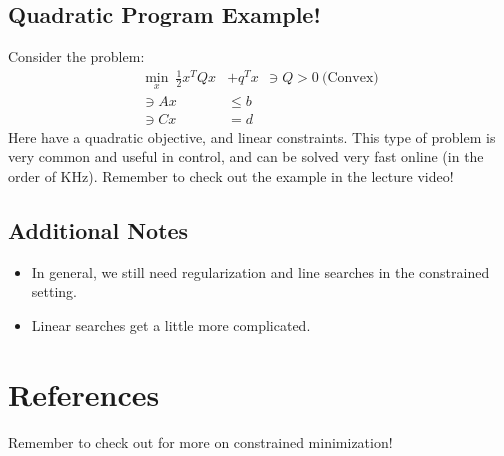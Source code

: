 \subsection{Quadratic Program Example!}
Consider the problem: 
\begin{align}
    \min_x \ \frac{1}{2} x^T Q x &+ q^T x \ \ \ni Q >0  \ \textrm{(Convex)} \\
    \ni Ax &\leq b \\
    \ni Cx &= d
\end{align}
Here have a quadratic objective, and linear constraints. This type of problem is very common and useful in control, and can be solved very fast online (in the order of KHz).
Remember to check out the example in the lecture video! 

\subsection{Additional Notes}
\begin{itemize}
    \item In general, we still need regularization and line searches in the constrained setting. 
    \item Linear searches get a little more complicated. 
\end{itemize}

\section{References}
Remember to check out \cite{nocedal2006numerical} for more on constrained minimization! 

\printbibliography